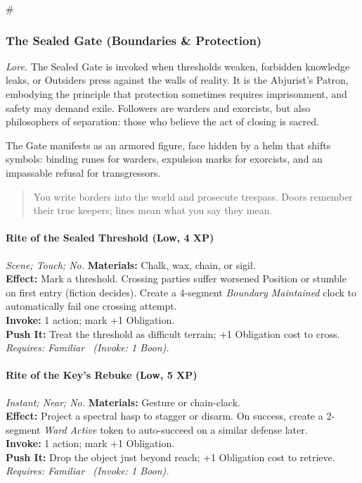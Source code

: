 # %

\subsubsection{The Sealed Gate (Boundaries \& Protection)}
\textit{Lore.} The Sealed Gate is invoked when thresholds weaken, forbidden knowledge leaks, or Outsiders press against the walls of reality. It is the Abjurist's Patron, embodying the principle that protection sometimes requires imprisonment, and safety may demand exile. Followers are warders and exorcists, but also philosophers of separation: those who believe the act of closing is sacred.

The Gate manifests as an armored figure, face hidden by a helm that shifts symbols: binding runes for warders, expulsion marks for exorcists, and an impassable refusal for transgressors.

\begin{quote}
You write borders into the world and prosecute trespass. Doors remember their true keepers; lines mean what you say they mean.
\end{quote}

\paragraph*{Rite of the Sealed Threshold (Low, 4 XP)} \emph{Scene; Touch; No.}
\textbf{Materials:} Chalk, wax, chain, or sigil.\\
\textbf{Effect:} Mark a threshold. Crossing parties suffer worsened Position or stumble on first entry (fiction decides). Create a 4-segment \emph{Boundary Maintained} clock to automatically fail one crossing attempt.\\
\textbf{Invoke:} 1 action; mark +1 Obligation.\\
\textbf{Push It:} Treat the threshold as difficult terrain; +1 Obligation cost to cross.\\
\emph{Requires: Familiar \ (\textit{Invoke:} 1 Boon).}

\paragraph*{Rite of the Key's Rebuke (Low, 5 XP)} \emph{Instant; Near; No.}
\textbf{Materials:} Gesture or chain-clack.\\
\textbf{Effect:} Project a spectral hasp to stagger or disarm. On success, create a 2-segment \emph{Ward Active} token to auto-succeed on a similar defense later.\\
\textbf{Invoke:} 1 action; mark +1 Obligation.\\
\textbf{Push It:} Drop the object just beyond reach; +1 Obligation cost to retrieve.\\
\emph{Requires: Familiar \ (\textit{Invoke:} 1 Boon).}

